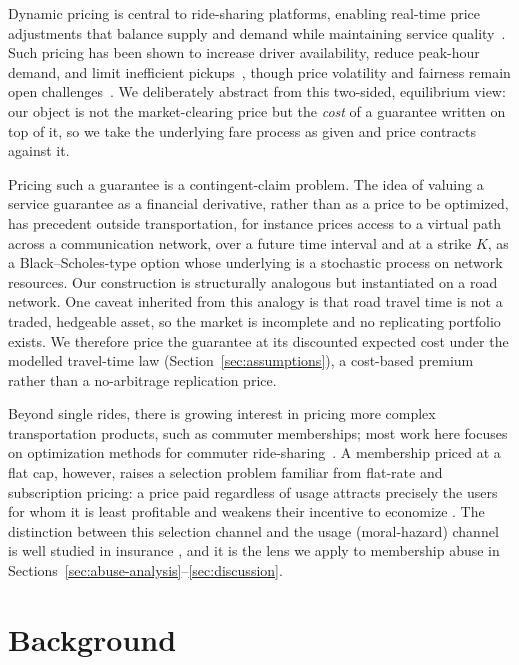 \documentclass[12pt]{article}
\begin{document}
Dynamic pricing is central to ride-sharing platforms, enabling real-time price
adjustments that balance supply and demand while maintaining service
quality~\citep{banerjee2015pricing, yan2020dynamic}. Such pricing has been shown
to increase driver availability, reduce peak-hour demand, and limit inefficient
pickups~\citep{chen2015peeking, hall2015effects}, though price volatility and
fairness remain open challenges~\citep{yan2020dynamic}. We deliberately abstract
from this two-sided, equilibrium view: our object is not the market-clearing
price but the \emph{cost} of a guarantee written on top of it, so we take the
underlying fare process as given and price contracts against it.

Pricing such a guarantee is a contingent-claim problem. The idea of valuing a
service guarantee as a financial derivative, rather than as a price to be
optimized, has precedent outside transportation, for instance \citep{rasmusson2001pricing} prices access to a virtual path across a communication network,
over a future time interval and at a strike $K$, as a Black--Scholes-type option
whose underlying is a stochastic process on network resources. Our
construction is structurally analogous but instantiated on a road network. One caveat inherited from this analogy is that road travel time is not a traded, hedgeable asset, so
the market is incomplete and no replicating portfolio exists. We therefore price
the guarantee at its discounted expected cost under the modelled travel-time law
(Section~\ref{sec:assumptions}), a cost-based premium rather than a
no-arbitrage replication price.

Beyond single rides, there is growing interest in pricing more complex
transportation products, such as commuter memberships; most work here focuses on
optimization methods for commuter ride-sharing~\citep{WANG2019390, MA2017345}. A membership priced at a flat cap, however, raises a selection problem familiar from flat-rate and subscription pricing: a price paid regardless of usage attracts precisely the users for whom it is least profitable and weakens their incentive to economize \citep{dellavigna2006gym, lambrecht2006paying}. The distinction between this selection channel and the usage (moral-hazard) channel is well studied in insurance \citep{powell2021disentangling}, and it is the lens we apply to membership abuse in Sections~\ref{sec:abuse-analysis}--\ref{sec:discussion}.



\section{Background}\label{sec:background}
\end{document}
